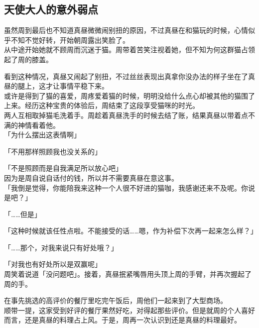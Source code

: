 \subsection{天使大人的意外弱点}

虽然周到最后也不知道真昼微微闹别扭的原因，不过真昼在和猫玩的时候，心情似乎不知不觉好转，开始朝周露出笑脸了。\\

从中途开始她就不顾周而沉迷于猫。周带着苦笑注视着她，但不知为何这群猫占领起了周的膝盖。

看到这种情况，真昼又闹起了别扭，不过丝丝表现出真拿你没办法的样子坐在了真昼的腿上，这才让事情平稳下来。\\

或许是得到了猫的喜爱，周疼爱着猫的时候，明明没给什么点心却被其他的猫围了上来。经历这种宝贵的体验后，周结束了这段享受猫咪的时光。\\

两人互相取掉猫毛洗着手。周趁着真昼洗手的时候去结了账，结果真昼以带着点不满的神情看着他。\\

「为什么摆出这表情啊」

「不用那样照顾我也没关系的」

「不是照顾而是自我满足所以放心吧」\\

因为是周自说自话付的钱，所以并不需要真昼在意这事。\\

「我倒是觉得，你能陪我来这种一个人很不好进的猫咖，我感谢还来不及呢。你说是吧？」

「……但是」

「这种时候就该任性点啦。不能接受的话……嗯，作为补偿下次再一起来怎么样？」

「……那个，对我来说只有好处哦？」

「对我也有好处所以是双赢呢」\\

周笑着说道「没问题吧」。接着，真昼抿紧嘴唇用头顶上周的手臂，并再次握起了周的手。\\

\vspace{2\baselineskip}

在事先挑选的高评价的餐厅里吃完午饭后，周他们一起来到了大型商场。\\

顺带一提，这家受到好评的餐厅果然好吃，对得起那些评价。但是就周的个人喜好而言，还是真昼的料理占上风。于是，周再一次认识到还是真昼的料理最好。\\

